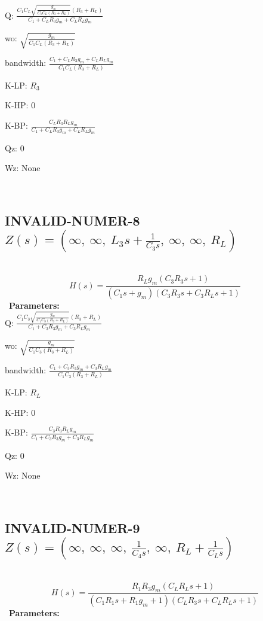 \documentclass{article}
\begin{document}
Q: $\frac{C_{1} C_{L} \sqrt{\frac{g_{m}}{C_{1} C_{L} \left(R_{3} + R_{L}\right)}} \left(R_{3} + R_{L}\right)}{C_{1} + C_{L} R_{3} g_{m} + C_{L} R_{L} g_{m}}$\ 

wo: $\sqrt{\frac{g_{m}}{C_{1} C_{L} \left(R_{3} + R_{L}\right)}}$\ 

bandwidth: $\frac{C_{1} + C_{L} R_{3} g_{m} + C_{L} R_{L} g_{m}}{C_{1} C_{L} \left(R_{3} + R_{L}\right)}$\ 

K-LP: $R_{3}$\ 

K-HP: $0$\ 

K-BP: $\frac{C_{L} R_{3} R_{L} g_{m}}{C_{1} + C_{L} R_{3} g_{m} + C_{L} R_{L} g_{m}}$\ 

Qz: $0$\ 

Wz: $\text{None}$\ 

\ 

\subsection{INVALID-NUMER-8 $Z(s) = \left( \infty, \  \infty, \  L_{3} s + \frac{1}{C_{3} s}, \  \infty, \  \infty, \  R_{L}\right)$ } \ 
\textbf{\[H(s) = \frac{R_{L} g_{m} \left(C_{3} R_{3} s + 1\right)}{\left(C_{1} s + g_{m}\right) \left(C_{3} R_{3} s + C_{3} R_{L} s + 1\right)}\] } \ 
\textbf{Parameters:}\\ 

Q: $\frac{C_{1} C_{3} \sqrt{\frac{g_{m}}{C_{1} C_{3} \left(R_{3} + R_{L}\right)}} \left(R_{3} + R_{L}\right)}{C_{1} + C_{3} R_{3} g_{m} + C_{3} R_{L} g_{m}}$\ 

wo: $\sqrt{\frac{g_{m}}{C_{1} C_{3} \left(R_{3} + R_{L}\right)}}$\ 

bandwidth: $\frac{C_{1} + C_{3} R_{3} g_{m} + C_{3} R_{L} g_{m}}{C_{1} C_{3} \left(R_{3} + R_{L}\right)}$\ 

K-LP: $R_{L}$\ 

K-HP: $0$\ 

K-BP: $\frac{C_{3} R_{3} R_{L} g_{m}}{C_{1} + C_{3} R_{3} g_{m} + C_{3} R_{L} g_{m}}$\ 

Qz: $0$\ 

Wz: $\text{None}$\ 

\ 

\subsection{INVALID-NUMER-9 $Z(s) = \left( \infty, \  \infty, \  \infty, \  \frac{1}{C_{4} s}, \  \infty, \  R_{L} + \frac{1}{C_{L} s}\right)$ } \ 
\textbf{\[H(s) = \frac{R_{1} R_{3} g_{m} \left(C_{L} R_{L} s + 1\right)}{\left(C_{1} R_{1} s + R_{1} g_{m} + 1\right) \left(C_{L} R_{3} s + C_{L} R_{L} s + 1\right)}\] } \ 
\textbf{Parameters:}\\ 
\end{document}
